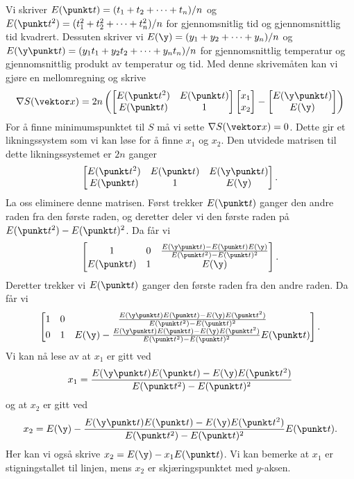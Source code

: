 Vi skriver $E(\punkt t) = (t_1 + t_2 + \dots + t_n)/n$ og $E(\punkt t^2) = (t_1^2 + t_2^2 + \dots + t_n^2)/n$ for 
gjennomsnitlig tid og gjennomsnittlig tid kvadrert. Dessuten skriver vi $E(\y) = (y_1 + y_2 + \dots + y_n)/n$ og
$E(\y \punkt t) = (y_1t_1 + y_2t_2 + \dots + y_nt_n)/n$ for gjennomsnittlig temperatur og gjennomsnittlig produkt av
temperatur og tid. Med denne skrivemåten kan vi gjøre en mellomregning og skrive
$$\nabla S(\vektor x) = 2n\left(
\begin{bmatrix}E(\punkt t^2) & E(\punkt t) \\ E(\punkt t) & 1\end{bmatrix} \begin{bmatrix}x_1 \\ x_2\end{bmatrix} - \begin{bmatrix}E(\y \punkt t)\\E(\y)\end{bmatrix}\right)$$
For å finne minimumspunktet til $S$ må vi sette $\nabla S(\vektor x) = 0$. Dette gir et likningssystem som vi kan løse for å finne $x_1$ og $x_2$. Den utvidede matrisen til dette likningssystemet er $2n$ ganger
$$\begin{bmatrix}E(\punkt t^2) & E(\punkt t) & E(\y \punkt t) \\ E(\punkt t) & 1 & E(\y)\end{bmatrix}.$$
La oss eliminere denne matrisen. Først trekker $E(\punkt t)$ ganger den andre raden fra den første raden, og deretter deler vi den første raden på $E(\punkt t^2) - E(\punkt t)^2$. Da får vi
$$\begin{bmatrix}1 & 0  & \frac{E(\y \punkt t) - E(\punkt t)E(\y)}{E(\punkt t^2) - E(\punkt t)^2} \\ E(\punkt t) & 1 & E(\y)\end{bmatrix}.$$
Deretter trekker vi $E(\punkt t)$ ganger den første raden fra den andre raden. Da får vi
$$\begin{bmatrix}1 & 0 &
  \frac{E(\y \punkt t)E(\punkt t) - E(\y)E(\punkt t^2)}{E(\punkt t^2) - E(\punkt t)^2} \\
0 & 1 &
E(\y) - \frac{E(\y \punkt t)E(\punkt t) - E(\y)E(\punkt t^2)}{E(\punkt t^2) - E(\punkt t)^2}E(\punkt t) 
\end{bmatrix}.$$
Vi kan nå lese av at $x_1$ er gitt ved
$$x_1 = \frac{E(\y \punkt t)E(\punkt t) - E(\y)E(\punkt t^2)}{E(\punkt t^2) - E(\punkt t)^2}$$
og at $x_2$ er gitt ved
$$x_2 = E(\y) - \frac{E(\y \punkt t)E(\punkt t) - E(\y)E(\punkt t^2)}{E(\punkt t^2) - E(\punkt t)^2}E(\punkt t).$$
Her kan vi også skrive $x_2 = E(\y) - x_1E(\punkt t)$.
Vi kan bemerke at $x_1$ er stigningstallet til linjen, mens $x_2$ er skjæringspunktet med $y$-aksen.

